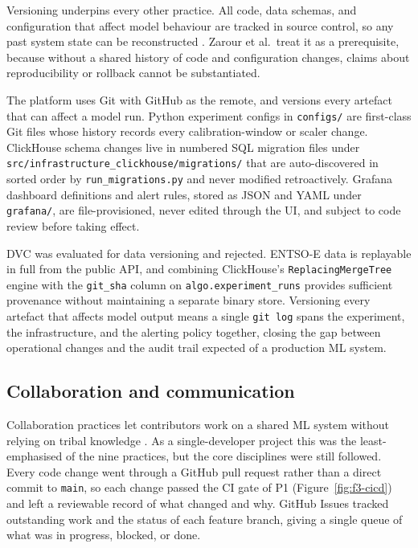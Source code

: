 Versioning underpins every other practice. All code, data schemas, and
configuration that affect model behaviour are tracked in source control, so any
past system state can be reconstructed \cite{zarour2025}. Zarour et al.\ treat it as a prerequisite, because without a shared history of code and configuration changes,
claims about reproducibility or rollback cannot be substantiated.

The platform uses Git with GitHub as the remote, and versions every artefact
that can affect a model run. Python experiment configs in \texttt{configs/} are
first-class Git files whose history records every calibration-window or scaler
change. ClickHouse schema changes live in numbered SQL migration files under
\texttt{src/infrastructure\_clickhouse/migrations/} that are auto-discovered in
sorted order by \texttt{run\_migrations.py} and never modified retroactively.
Grafana dashboard definitions and alert rules, stored as JSON and YAML under
\texttt{grafana/}, are file-provisioned, never edited through the UI, and subject
to code review before taking effect.

DVC was evaluated for data versioning and rejected. ENTSO-E data is replayable
in full from the public API, and combining ClickHouse's
\texttt{ReplacingMergeTree} engine with the \texttt{git\_sha} column on
\texttt{algo.experiment\_runs} provides sufficient provenance without
maintaining a separate binary store. Versioning every artefact that affects
model output means a single \texttt{git log} spans the experiment, the
infrastructure, and the alerting policy together, closing the gap between
operational changes and the audit trail expected of a production ML system.

\subsection{Collaboration and communication}

Collaboration practices let contributors work on a shared ML system without
relying on tribal knowledge \cite{zarour2025}. As a single-developer project this
was the least-emphasised of the nine practices, but the core disciplines were
still followed. Every code change went through a GitHub pull request rather
than a direct commit to \texttt{main}, so each change passed the CI gate of P1
(Figure~\ref{fig:f3-cicd}) and left a reviewable record of what changed and why.
GitHub Issues tracked outstanding work and the status of each feature
branch, giving a single queue of what was in progress, blocked, or done.

